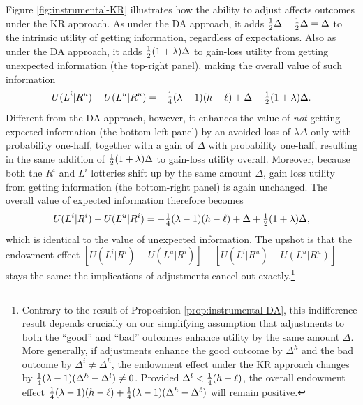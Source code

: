 Figure \ref{fig:instrumental-KR} illustrates how the ability to adjust affects outcomes under the KR approach. As under the DA approach, it adds $\tfrac{1}{2} \Delta + \tfrac{1}{2} \Delta = \Delta$ to the intrinsic utility of getting information, regardless of expectations. Also as under the DA approach, it adds $\tfrac{1}{2} (1+\lambda) \Delta$ to gain-loss utility from getting unexpected information (the top-right panel), making the overall value of such information
\begin{equation*}
  U(L^i|R^u)-U(L^u|R^u)=-\tfrac{1}{4}(\lambda-1)(h-\ell)+\Delta+\tfrac{1}{2} (1+\lambda)\Delta.
\end{equation*}
Different from the DA approach, however, it enhances the value of \emph{not} getting expected information (the bottom-left panel) by an avoided loss of $\lambda \Delta$ only with probability one-half, together with a gain of $\Delta$ with probability one-half, resulting in the same addition of $\tfrac{1}{2}(1+\lambda)\Delta$ to gain-loss utility overall. Moreover, because both the $R^i$ and $L^i$ lotteries shift up by the same amount $\Delta$, gain loss utility from getting information (the bottom-right panel) is again unchanged. The overall value of expected information therefore becomes
\begin{equation*}
  U(L^i|R^i)-U(L^u|R^i)=-\tfrac{1}{4}(\lambda-1)(h-\ell)+\Delta+\tfrac{1}{2} (1+\lambda)\Delta,
\end{equation*}
which is identical to the value of unexpected information. The upshot is that the endowment effect $[U(L^i|R^i)-U(L^u|R^i)]-[U(L^i|R^u)-U(L^u|R^u)]$ stays the same: the implications of adjustments cancel out exactly.\footnote{Contrary to the result of Proposition \ref{prop:instrumental-DA}, this indifference result depends crucially on our simplifying assumption that adjustments to both the \enquote{good} and \enquote{bad} outcomes enhance utility by the same amount $\Delta$. More generally, if adjustments enhance the good outcome by $\Delta^h$ and the bad outcome by $\Delta^i \neq \Delta^h$, the endowment effect under the KR approach changes by $\tfrac{1}{4}(\lambda-1)(\Delta^h-\Delta^l) \neq 0$. Provided $\Delta^l<\tfrac{1}{4}(h-\ell)$, the overall endowment effect $\tfrac{1}{4}(\lambda-1)(h-\ell)+\tfrac{1}{4}(\lambda-1)(\Delta^h-\Delta^\ell)$ will remain positive.}

\FloatBarrier
